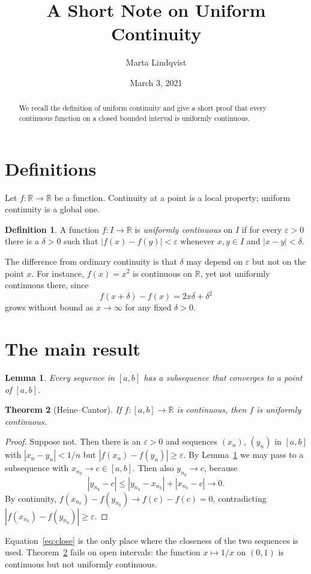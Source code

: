 \documentclass[11pt,letterpaper]{article}
\title{A Short Note on Uniform Continuity}
\author{Marta Lindqvist}
\date{March 3, 2021}
\newtheorem{theorem}{Theorem}
\newtheorem{lemma}[theorem]{Lemma}
\theoremstyle{definition}
\newtheorem{definition}{Definition}
\newcommand{\R}{\mathbb{R}}
\newcommand{\eps}{\varepsilon}
\begin{document}
\maketitle

\begin{abstract}
We recall the definition of uniform continuity and give a short proof that every continuous function on a closed bounded interval is uniformly continuous.
\end{abstract}

\section{Definitions}
Let $f\colon \R \to \R$ be a function. Continuity at a point is a local property; uniform continuity is a global one.

\begin{definition}\label{def:uc}
A function $f\colon I\to\R$ is \emph{uniformly continuous} on $I$ if for every $\eps>0$ there is a $\delta>0$ such that $|f(x)-f(y)|<\eps$ whenever $x,y\in I$ and $|x-y|<\delta$.
\end{definition}

The difference from ordinary continuity is that $\delta$ may depend on $\eps$ but not on the point $x$. For instance, $f(x)=x^2$ is continuous on $\R$, yet not uniformly continuous there, since
\[
  f(x+\delta)-f(x) = 2x\delta+\delta^2
\]
grows without bound as $x\to\infty$ for any fixed $\delta>0$.

\section{The main result}
\begin{lemma}\label{lem:cover}
Every sequence in $[a,b]$ has a subsequence that converges to a point of $[a,b]$.
\end{lemma}

\begin{theorem}[Heine--Cantor]\label{thm:hc}
If $f\colon[a,b]\to\R$ is continuous, then $f$ is uniformly continuous.
\end{theorem}

\begin{proof}
Suppose not. Then there is an $\eps>0$ and sequences $(x_n)$, $(y_n)$ in $[a,b]$ with $|x_n-y_n|<1/n$ but $|f(x_n)-f(y_n)|\ge\eps$. By Lemma~\ref{lem:cover} we may pass to a subsequence with $x_{n_k}\to c\in[a,b]$. Then also $y_{n_k}\to c$, because
\begin{equation}\label{eq:close}
  |y_{n_k}-c| \le |y_{n_k}-x_{n_k}| + |x_{n_k}-c| \to 0 .
\end{equation}
By continuity, $f(x_{n_k})-f(y_{n_k})\to f(c)-f(c)=0$, contradicting $|f(x_{n_k})-f(y_{n_k})|\ge\eps$.
\end{proof}

Equation~\eqref{eq:close} is the only place where the closeness of the two sequences is used. Theorem~\ref{thm:hc} fails on open intervals: the function $x\mapsto 1/x$ on $(0,1)$ is continuous but not uniformly continuous.
\end{document}
